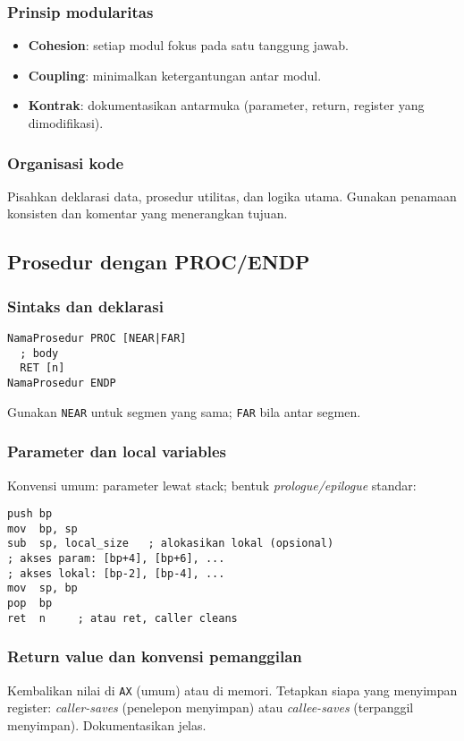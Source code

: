 \documentclass[../main.tex]{subfiles}
\begin{document}
\subsubsection{Prinsip modularitas}
\begin{itemize}
  \item \textbf{Cohesion}: setiap modul fokus pada satu tanggung jawab.
  \item \textbf{Coupling}: minimalkan ketergantungan antar modul.
  \item \textbf{Kontrak}: dokumentasikan antarmuka (parameter, return, register yang dimodifikasi).
\end{itemize}

\subsubsection{Organisasi kode}
Pisahkan deklarasi data, prosedur utilitas, dan logika utama. Gunakan penamaan konsisten dan komentar yang menerangkan tujuan.

\subsection{Prosedur dengan PROC/ENDP}
\subsubsection{Sintaks dan deklarasi}
\begin{verbatim}
NamaProsedur PROC [NEAR|FAR]
  ; body
  RET [n]
NamaProsedur ENDP
\end{verbatim}
Gunakan \texttt{NEAR} untuk segmen yang sama; \texttt{FAR} bila antar segmen.

\subsubsection{Parameter dan local variables}
Konvensi umum: parameter lewat stack; bentuk \textit{prologue/epilogue} standar:
\begin{verbatim}
push bp
mov  bp, sp
sub  sp, local_size   ; alokasikan lokal (opsional)
; akses param: [bp+4], [bp+6], ...
; akses lokal: [bp-2], [bp-4], ...
mov  sp, bp
pop  bp
ret  n     ; atau ret, caller cleans
\end{verbatim}

\subsubsection{Return value dan konvensi pemanggilan}
Kembalikan nilai di \texttt{AX} (umum) atau di memori. Tetapkan siapa yang menyimpan register: \textit{caller-saves} (penelepon menyimpan) atau \textit{callee-saves} (terpanggil menyimpan). Dokumentasikan jelas.
\end{document}
